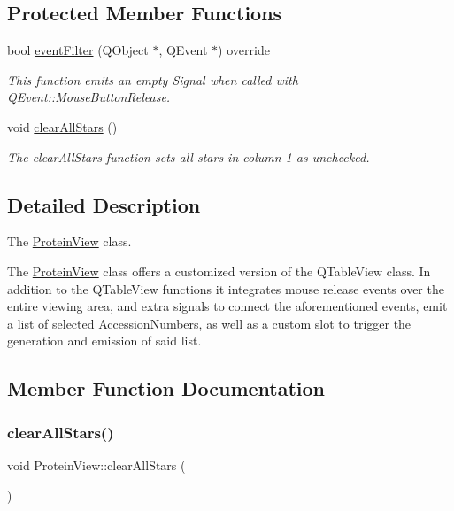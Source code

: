\subsection*{Protected Member Functions}
\begin{DoxyCompactItemize}
\item 
bool \mbox{\hyperlink{class_protein_view_ad6a88c7d11cfd0fef51f5e3da4cf3476}{event\+Filter}} (Q\+Object $\ast$, Q\+Event $\ast$) override
\begin{DoxyCompactList}\small\item\em This function emits an empty Signal when called with Q\+Event\+::\+Mouse\+Button\+Release. \end{DoxyCompactList}\item 
void \mbox{\hyperlink{class_protein_view_aa7bd73195010b5ddaad96ea5b9695b3b}{clear\+All\+Stars}} ()
\begin{DoxyCompactList}\small\item\em The clear\+All\+Stars function sets all stars in column 1 as unchecked. \end{DoxyCompactList}\end{DoxyCompactItemize}


\subsection{Detailed Description}
The \mbox{\hyperlink{class_protein_view}{Protein\+View}} class. 

The \mbox{\hyperlink{class_protein_view}{Protein\+View}} class offers a customized version of the Q\+Table\+View class. In addition to the Q\+Table\+View functions it integrates mouse release events over the entire viewing area, and extra signals to connect the aforementioned events, emit a list of selected Accession\+Numbers, as well as a custom slot to trigger the generation and emission of said list. 

\subsection{Member Function Documentation}
\mbox{\label{class_protein_view_aa7bd73195010b5ddaad96ea5b9695b3b}} 
\subsubsection{\texorpdfstring{clear\+All\+Stars()}{clearAllStars()}}
{\footnotesize\ttfamily void Protein\+View\+::clear\+All\+Stars (\begin{DoxyParamCaption}{ }\end{DoxyParamCaption})\hspace{0.3cm}{\ttfamily [protected]}}




